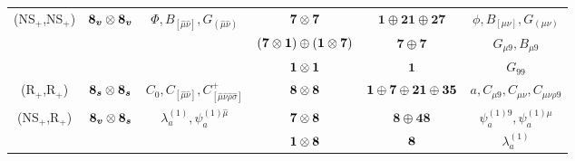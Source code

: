 {\begin{tabular}{|cccccc|}
		\multicolumn{1}{|c|}{\multirow{3}{*}{(NS$_+$,NS$_+$)}} & \multicolumn{1}{c|}{\multirow{3}{*}{$\boldsymbol{8_v} \otimes \boldsymbol{8_v}$}} & \multicolumn{1}{c|}{\multirow{3}{*}{$\Phi, B_{[\hat{\mu}\hat{\nu}]}, G_{(\hat{\mu}\hat{\nu})}$}}       & \multicolumn{1}{c|}{$\boldsymbol{7} \otimes \boldsymbol{7}$}                          & \multicolumn{1}{c|}{$\boldsymbol{1} \oplus \boldsymbol{21}\oplus\boldsymbol{27}$}     & $\phi, B_{[\mu\nu]}, G_{(\mu\nu)}$         \\ \cline{4-6}
		\multicolumn{1}{|c|}{}                                 & \multicolumn{1}{c|}{}                                 & \multicolumn{1}{c|}{}                                                                                  & \multicolumn{1}{c|}{$(\boldsymbol{7} \otimes \boldsymbol{1}) \oplus (\boldsymbol{1} \otimes \boldsymbol{7})$} & \multicolumn{1}{c|}{$\boldsymbol{7}\oplus \boldsymbol{7}$}                            & $G_{\mu9}, B_{\mu9}$                       \\ \cline{4-6}
		\multicolumn{1}{|c|}{}                                 & \multicolumn{1}{c|}{}                                 & \multicolumn{1}{c|}{}                                                                                  & \multicolumn{1}{c|}{$\boldsymbol{1} \otimes \boldsymbol{1}$}                                  & \multicolumn{1}{c|}{$\boldsymbol{1}$}                                                 & $G_{99}$                                   \\ \hline
		\multicolumn{1}{|c|}{(R$_+$,R$_+$)}                    & \multicolumn{1}{c|}{$\boldsymbol{8_s} \otimes \boldsymbol{8_s}$}                  & \multicolumn{1}{c|}{$C_0, C_{[\hat{\mu}\hat{\nu}]}, C_{[\hat{\mu}\hat{\nu}\hat{\rho}\hat{\sigma}]}^+$} & \multicolumn{1}{c|}{$\boldsymbol{8} \otimes \boldsymbol{8}$}                          & \multicolumn{1}{c|}{$\boldsymbol{1} \oplus \boldsymbol{7} \oplus \boldsymbol{21} \oplus \boldsymbol{35}$} & $a, C_{\mu9}, C_{\mu\nu}, C_{\mu\nu\rho9}$ \\ \hline
		\multicolumn{1}{|c|}{\multirow{2}{*}{(NS$_+$,R$_+$)}}  & \multicolumn{1}{c|}{\multirow{2}{*}{$\boldsymbol{8_v} \otimes \boldsymbol{8_s}$}} & \multicolumn{1}{c|}{\multirow{2}{*}{${\lambda}_a^{(1)}, {\psi}^{(1)\hat{\mu}}_a$}}                     & \multicolumn{1}{c|}{$\boldsymbol{7} \otimes \boldsymbol{8}$}                          & \multicolumn{1}{c|}{$\boldsymbol{8} \oplus\boldsymbol{48}$}                           & $\psi^{(1)9}_a, \psi^{(1)\mu}_a$           \\ \cline{4-6}
		\multicolumn{1}{|c|}{}                                 & \multicolumn{1}{c|}{}                                 & \multicolumn{1}{c|}{}                                                                                  & \multicolumn{1}{c|}{$\boldsymbol{1} \otimes \boldsymbol{8}$}                              & \multicolumn{1}{c|}{$\boldsymbol{8}$}                                                         & $\lambda^{(1)}_a$                          \\ \hline

\end{tabular}}
